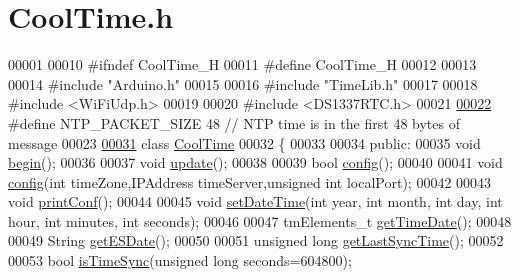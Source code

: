 \hypertarget{_cool_time_8h_source}{}\section{Cool\+Time.\+h}

\begin{DoxyCode}
00001 
00010 \textcolor{preprocessor}{#ifndef CoolTime\_H}
00011 \textcolor{preprocessor}{#define CoolTime\_H}
00012 
00013 
00014 \textcolor{preprocessor}{#include "Arduino.h"}
00015 
00016 \textcolor{preprocessor}{#include "TimeLib.h"}
00017 
00018 \textcolor{preprocessor}{#include <WiFiUdp.h>}
00019 
00020 \textcolor{preprocessor}{#include <DS1337RTC.h>}
00021 
\hyperlink{_cool_time_8h_a56a6ea64006651b4f42adf713e244f06}{00022} \textcolor{preprocessor}{#define NTP\_PACKET\_SIZE  48 // NTP time is in the first 48 bytes of message}
00023 
\hyperlink{class_cool_time}{00031} \textcolor{keyword}{class }\hyperlink{class_cool_time}{CoolTime}
00032 \{
00033 
00034 \textcolor{keyword}{public}:
00035     \textcolor{keywordtype}{void} \hyperlink{class_cool_time_ab1976cf718b950bc31e003c3323b8adb}{begin}();
00036     
00037     \textcolor{keywordtype}{void} \hyperlink{class_cool_time_aae601f795452cfa48d9fb337aed483a8}{update}();
00038     
00039     \textcolor{keywordtype}{bool} \hyperlink{class_cool_time_a87c28260c1bc77091162cbcf1ee2e129}{config}();
00040 
00041     \textcolor{keywordtype}{void} \hyperlink{class_cool_time_a87c28260c1bc77091162cbcf1ee2e129}{config}(\textcolor{keywordtype}{int} timeZone,IPAddress timeServer,\textcolor{keywordtype}{unsigned} \textcolor{keywordtype}{int} localPort); 
00042     
00043     \textcolor{keywordtype}{void} \hyperlink{class_cool_time_af355e7f9b3898211cd2ff25eab5933b1}{printConf}();
00044 
00045     \textcolor{keywordtype}{void} \hyperlink{class_cool_time_ab81ea7fdaace111aa01cc1ec84c6d297}{setDateTime}(\textcolor{keywordtype}{int} year, \textcolor{keywordtype}{int} month, \textcolor{keywordtype}{int} day, \textcolor{keywordtype}{int} hour, \textcolor{keywordtype}{int} minutes, \textcolor{keywordtype}{int} seconds);
00046     
00047     tmElements\_t \hyperlink{class_cool_time_a7a7501c5ca77dd1248bea704c44f986c}{getTimeDate}();
00048 
00049     String \hyperlink{class_cool_time_ac4f32ee513c1328d984306645e8785a4}{getESDate}();
00050     
00051     \textcolor{keywordtype}{unsigned} \textcolor{keywordtype}{long} \hyperlink{class_cool_time_a5d17f707a9d337720493b2bce9d41c21}{getLastSyncTime}();
00052     
00053     \textcolor{keywordtype}{bool} \hyperlink{class_cool_time_a5ae038a4498602b189f76a10bf02adf8}{isTimeSync}(\textcolor{keywordtype}{unsigned} \textcolor{keywordtype}{long} seconds=604800);

\end{DoxyCode}
